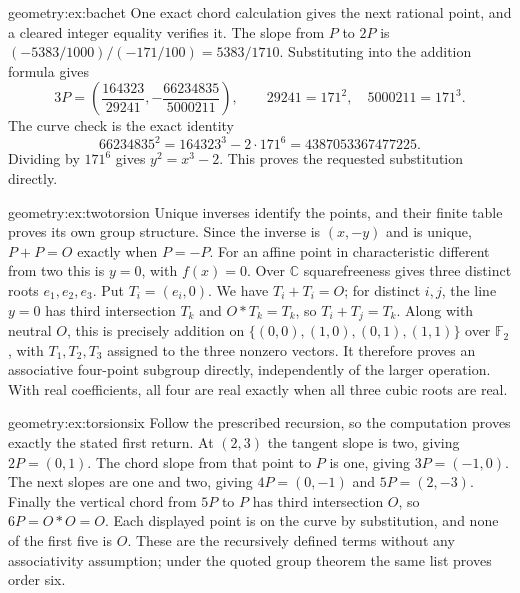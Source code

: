 \begin{solution}{geometry:ex:bachet}
\idea One exact chord calculation gives the next rational point, and a cleared integer equality verifies it.
\writeup The slope from $P$ to $2P$ is $(-5383/1000)/(-171/100)=5383/1710$. Substituting into the addition formula gives
\[
3P=\left(\frac{164323}{29241},-\frac{66234835}{5000211}\right),
\qquad29241=171^2,\quad5000211=171^3.
\]
The curve check is the exact identity
\[
66234835^2=164323^3-2\cdot171^6
=4387053367477225.
\]
Dividing by $171^6$ gives $y^2=x^3-2$. This proves the requested substitution directly.
\end{solution}
\begin{solution}{geometry:ex:twotorsion}
\idea Unique inverses identify the points, and their finite table proves its own group structure.
\writeup Since the inverse is $(x,-y)$ and is unique, $P+P=O$ exactly when $P=-P$. For an affine point in characteristic different from two this is $y=0$, with $f(x)=0$. Over $\mathbb C$ squarefreeness gives three distinct roots $e_1,e_2,e_3$. Put $T_i=(e_i,0)$. We have $T_i+T_i=O$; for distinct $i,j$, the line $y=0$ has third intersection $T_k$ and $O*T_k=T_k$, so $T_i+T_j=T_k$. Along with neutral $O$, this is precisely addition on $\{(0,0),(1,0),(0,1),(1,1)\}$ over $\mathbb F_2$, with $T_1,T_2,T_3$ assigned to the three nonzero vectors. It therefore proves an associative four-point subgroup directly, independently of the larger operation. With real coefficients, all four are real exactly when all three cubic roots are real.
\end{solution}
\begin{solution}{geometry:ex:torsionsix}
\idea Follow the prescribed recursion, so the computation proves exactly the stated first return.
\writeup At $(2,3)$ the tangent slope is two, giving $2P=(0,1)$. The chord slope from that point to $P$ is one, giving $3P=(-1,0)$. The next slopes are one and two, giving $4P=(0,-1)$ and $5P=(2,-3)$. Finally the vertical chord from $5P$ to $P$ has third intersection $O$, so $6P=O*O=O$. Each displayed point is on the curve by substitution, and none of the first five is $O$. These are the recursively defined terms without any associativity assumption; under the quoted group theorem the same list proves order six.
\end{solution}
